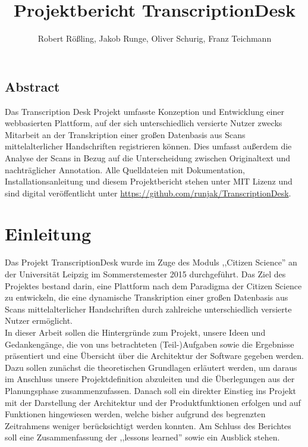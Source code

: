 \documentclass{article}
\title{Projektbericht TranscriptionDesk}
\author{Robert Rößling, Jakob Runge, Oliver Schurig, Franz Teichmann}
\begin{document}

\maketitle

\subsection*{Abstract}
Das Transcription Desk Projekt umfasste Konzeption und Entwicklung einer webbasierten Plattform, auf der sich unterschiedlich versierte Nutzer zwecks Mitarbeit an der Transkription einer großen Datenbasis aus Scans mittelalterlicher Handschriften registrieren können. Dies umfasst außerdem die Analyse der Scans in Bezug auf die Unterscheidung zwischen Originaltext und nachträglicher Annotation.
Alle Quelldateien mit Dokumentation, Installationsanleitung und diesem Projektbericht stehen unter MIT Lizenz und sind digital veröffentlicht unter \url{https://github.com/runjak/TranscriptionDesk}. 

\tableofcontents
\newpage

\section{Einleitung}
Das Projekt TranscriptionDesk wurde im Zuge des Moduls ,,Citizen Science'' an der Universität Leipzig im Sommerstemester 2015 durchgeführt. Das Ziel des Projektes bestand darin, eine Plattform nach dem Paradigma der Citizen Science zu entwickeln, die eine dynamische Transkription einer großen Datenbasis aus Scans mittelalterlicher Handschriften durch zahlreiche unterschiedlich versierte Nutzer ermöglicht. \\
In dieser Arbeit sollen die Hintergründe zum Projekt, unsere Ideen und Gedankengänge, die von uns betrachteten (Teil-)Aufgaben sowie die Ergebnisse präsentiert und eine Übersicht über die Architektur der Software gegeben werden. Dazu sollen zunächst die theoretischen Grundlagen erläutert werden, um daraus im Anschluss unsere Projektdefinition abzuleiten und die Überlegungen aus der Planungsphase zusammenzufassen.
Danach soll ein direkter Einstieg ins Projekt mit der Darstellung der Architektur und der Produktfunktionen erfolgen und auf Funktionen hingewiesen werden, welche bisher aufgrund des begrenzten Zeitrahmens weniger berücksichtigt werden konnten.
Am Schluss des Berichtes soll eine Zusammenfassung der ,,lessons learned'' sowie ein Ausblick stehen.
\end{document}
